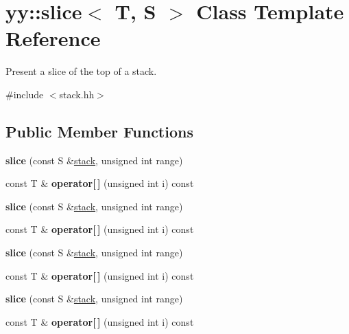 \hypertarget{classyy_1_1slice}{\section{yy\-:\-:slice$<$ T, S $>$ Class Template Reference}
\label{classyy_1_1slice}
}


Present a slice of the top of a stack.  




{\ttfamily \#include $<$stack.\-hh$>$}

\subsection*{Public Member Functions}
\begin{DoxyCompactItemize}
\item 
\hypertarget{classyy_1_1slice_a09b1750a81ae90227fdceb482fa06797}{{\bfseries slice} (const S \&\hyperlink{classyy_1_1stack}{stack}, unsigned int range)}\label{classyy_1_1slice_a09b1750a81ae90227fdceb482fa06797}

\item 
\hypertarget{classyy_1_1slice_ad44e52c28c2962f9dd5bf327510c1237}{const T \& {\bfseries operator\mbox{[}$\,$\mbox{]}} (unsigned int i) const }\label{classyy_1_1slice_ad44e52c28c2962f9dd5bf327510c1237}

\item 
\hypertarget{classyy_1_1slice_a09b1750a81ae90227fdceb482fa06797}{{\bfseries slice} (const S \&\hyperlink{classyy_1_1stack}{stack}, unsigned int range)}\label{classyy_1_1slice_a09b1750a81ae90227fdceb482fa06797}

\item 
\hypertarget{classyy_1_1slice_ad44e52c28c2962f9dd5bf327510c1237}{const T \& {\bfseries operator\mbox{[}$\,$\mbox{]}} (unsigned int i) const }\label{classyy_1_1slice_ad44e52c28c2962f9dd5bf327510c1237}

\item 
\hypertarget{classyy_1_1slice_a09b1750a81ae90227fdceb482fa06797}{{\bfseries slice} (const S \&\hyperlink{classyy_1_1stack}{stack}, unsigned int range)}\label{classyy_1_1slice_a09b1750a81ae90227fdceb482fa06797}

\item 
\hypertarget{classyy_1_1slice_ad44e52c28c2962f9dd5bf327510c1237}{const T \& {\bfseries operator\mbox{[}$\,$\mbox{]}} (unsigned int i) const }\label{classyy_1_1slice_ad44e52c28c2962f9dd5bf327510c1237}

\item 
\hypertarget{classyy_1_1slice_a09b1750a81ae90227fdceb482fa06797}{{\bfseries slice} (const S \&\hyperlink{classyy_1_1stack}{stack}, unsigned int range)}\label{classyy_1_1slice_a09b1750a81ae90227fdceb482fa06797}

\item 
\hypertarget{classyy_1_1slice_ad44e52c28c2962f9dd5bf327510c1237}{const T \& {\bfseries operator\mbox{[}$\,$\mbox{]}} (unsigned int i) const }\label{classyy_1_1slice_ad44e52c28c2962f9dd5bf327510c1237}

\end{DoxyCompactItemize}
